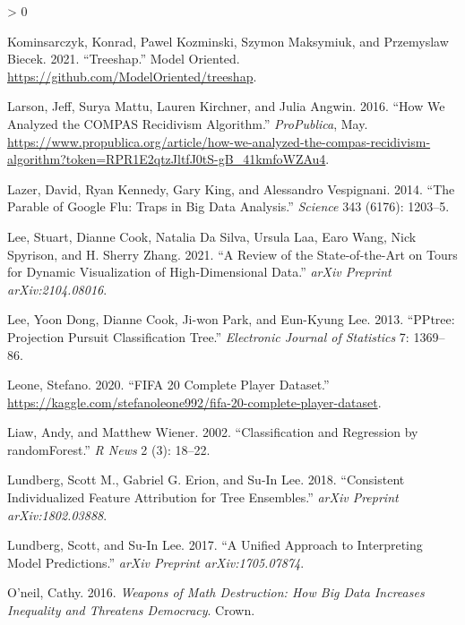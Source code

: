 \documentclass[
  article]{article}
\newlength{\cslhangindent}
\newenvironment{CSLReferences}[2] %
 {%
  \setlength{\parindent}{0pt}
  \ifodd #1 \everypar{\setlength{\hangindent}{\cslhangindent}}\ignorespaces\fi
  \ifnum #2 > 0
  \setlength{\parskip}{#2\baselineskip}
  \fi
 }%
 {}
\begin{document}
\begin{CSLReferences}{1}{0}
\leavevmode\hypertarget{ref-kominsarczyk_treeshap_2021}{}%
Kominsarczyk, Konrad, Pawel Kozminski, Szymon Maksymiuk, and Przemyslaw Biecek. 2021. {``Treeshap.''} Model Oriented. \url{https://github.com/ModelOriented/treeshap}.

\leavevmode\hypertarget{ref-larson_how_2016}{}%
Larson, Jeff, Surya Mattu, Lauren Kirchner, and Julia Angwin. 2016. {``How {We} {Analyzed} the {COMPAS} {Recidivism} {Algorithm}.''} \emph{ProPublica}, May. \url{https://www.propublica.org/article/how-we-analyzed-the-compas-recidivism-algorithm?token=RPR1E2qtzJltfJ0tS-gB_41kmfoWZAu4}.

\leavevmode\hypertarget{ref-lazer_parable_2014}{}%
Lazer, David, Ryan Kennedy, Gary King, and Alessandro Vespignani. 2014. {``The Parable of {Google} {Flu}: Traps in Big Data Analysis.''} \emph{Science} 343 (6176): 1203--5.

\leavevmode\hypertarget{ref-lee_review_2021}{}%
Lee, Stuart, Dianne Cook, Natalia Da Silva, Ursula Laa, Earo Wang, Nick Spyrison, and H. Sherry Zhang. 2021. {``A {Review} of the {State}-of-the-{Art} on {Tours} for {Dynamic} {Visualization} of {High}-Dimensional {Data}.''} \emph{arXiv Preprint arXiv:2104.08016}.

\leavevmode\hypertarget{ref-lee_pptree_2013}{}%
Lee, Yoon Dong, Dianne Cook, Ji-won Park, and Eun-Kyung Lee. 2013. {``{PPtree}: {Projection} Pursuit Classification Tree.''} \emph{Electronic Journal of Statistics} 7: 1369--86.

\leavevmode\hypertarget{ref-leone_fifa_2020}{}%
Leone, Stefano. 2020. {``{FIFA} 20 Complete Player Dataset.''} \url{https://kaggle.com/stefanoleone992/fifa-20-complete-player-dataset}.

\leavevmode\hypertarget{ref-liaw_classification_2002}{}%
Liaw, Andy, and Matthew Wiener. 2002. {``Classification and Regression by {randomForest}.''} \emph{R News} 2 (3): 18--22.

\leavevmode\hypertarget{ref-lundberg_consistent_2018}{}%
Lundberg, Scott M., Gabriel G. Erion, and Su-In Lee. 2018. {``Consistent Individualized Feature Attribution for Tree Ensembles.''} \emph{arXiv Preprint arXiv:1802.03888}.

\leavevmode\hypertarget{ref-lundberg_unified_2017}{}%
Lundberg, Scott, and Su-In Lee. 2017. {``A Unified Approach to Interpreting Model Predictions.''} \emph{arXiv Preprint arXiv:1705.07874}.

\leavevmode\hypertarget{ref-oneil_weapons_2016}{}%
O'neil, Cathy. 2016. \emph{Weapons of Math Destruction: {How} Big Data Increases Inequality and Threatens Democracy}. Crown.


\end{CSLReferences}
\end{document}
